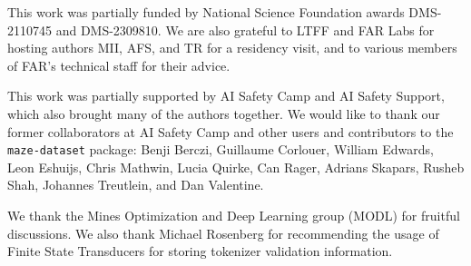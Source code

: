 This work was partially funded by National Science Foundation awards DMS-2110745 and DMS-2309810. We are also grateful to LTFF and FAR Labs for hosting authors MII, AFS, and TR for a residency visit, and to various members of FAR's technical staff for their advice.

This work was partially supported by AI Safety Camp and AI Safety Support, which also brought many of the authors together. We would like to thank our former collaborators at AI Safety Camp and other users and contributors to the  \texttt{maze-dataset} package: Benji Berczi, Guillaume Corlouer, William Edwards, Leon Eshuijs, Chris Mathwin, Lucia Quirke, Can Rager, Adrians Skapars, Rusheb Shah, Johannes Treutlein, and Dan Valentine.

We thank the Mines Optimization and Deep Learning group (MODL) for fruitful discussions. We also thank Michael Rosenberg for recommending the usage of Finite State Transducers for storing tokenizer validation information.